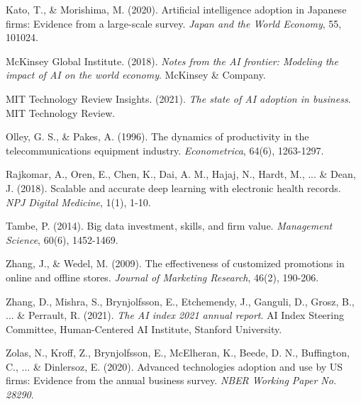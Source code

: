 \documentclass[12pt, a4paper]{article}
\begin{document}
\begin{thebibliography}{99}
Kato, T., \& Morishima, M. (2020). Artificial intelligence adoption in Japanese firms: Evidence from a large-scale survey. \textit{Japan and the World Economy}, 55, 101024.

McKinsey Global Institute. (2018). \textit{Notes from the AI frontier: Modeling the impact of AI on the world economy}. McKinsey \& Company.

MIT Technology Review Insights. (2021). \textit{The state of AI adoption in business}. MIT Technology Review.

Olley, G. S., \& Pakes, A. (1996). The dynamics of productivity in the telecommunications equipment industry. \textit{Econometrica}, 64(6), 1263-1297.

Rajkomar, A., Oren, E., Chen, K., Dai, A. M., Hajaj, N., Hardt, M., ... \& Dean, J. (2018). Scalable and accurate deep learning with electronic health records. \textit{NPJ Digital Medicine}, 1(1), 1-10.

Tambe, P. (2014). Big data investment, skills, and firm value. \textit{Management Science}, 60(6), 1452-1469.

Zhang, J., \& Wedel, M. (2009). The effectiveness of customized promotions in online and offline stores. \textit{Journal of Marketing Research}, 46(2), 190-206.

Zhang, D., Mishra, S., Brynjolfsson, E., Etchemendy, J., Ganguli, D., Grosz, B., ... \& Perrault, R. (2021). \textit{The AI index 2021 annual report}. AI Index Steering Committee, Human-Centered AI Institute, Stanford University.

Zolas, N., Kroff, Z., Brynjolfsson, E., McElheran, K., Beede, D. N., Buffington, C., ... \& Dinlersoz, E. (2020). Advanced technologies adoption and use by US firms: Evidence from the annual business survey. \textit{NBER Working Paper No. 28290}.

\end{thebibliography}
\end{document}
